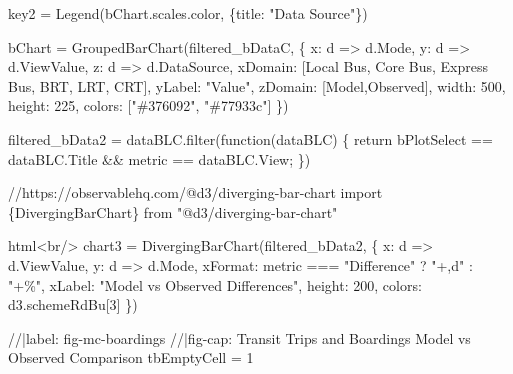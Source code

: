 \documentclass[
  letterpaper,
  DIV=11,
  numbers=noendperiod]{scrreprt}
\newenvironment{Shaded}{\begin{snugshade}}{\end{snugshade}}
\newcommand{\NormalTok}[1]{\textcolor[rgb]{0.00,0.23,0.31}{#1}}
\begin{document}
\begin{Shaded}
\begin{Highlighting}[]
\NormalTok{key2 = Legend(bChart.scales.color, \{title: "Data Source"\})}

\NormalTok{bChart = GroupedBarChart(filtered\_bDataC, \{}
\NormalTok{    x: d =\textgreater{} d.Mode,}
\NormalTok{    y: d =\textgreater{} d.ViewValue,}
\NormalTok{    z: d =\textgreater{} d.DataSource,}
\NormalTok{    xDomain: [\textquotesingle{}Local Bus\textquotesingle{}, \textquotesingle{}Core Bus\textquotesingle{}, \textquotesingle{}Express Bus\textquotesingle{}, \textquotesingle{}BRT\textquotesingle{}, \textquotesingle{}LRT\textquotesingle{}, \textquotesingle{}CRT\textquotesingle{}],}
\NormalTok{    yLabel: "Value",}
\NormalTok{    zDomain: [\textquotesingle{}Model\textquotesingle{},\textquotesingle{}Observed\textquotesingle{}],}
\NormalTok{    width: 500,}
\NormalTok{    height: 225,}
\NormalTok{    colors: ["\#376092", "\#77933c"]}
\NormalTok{\})}
\end{Highlighting}
\end{Shaded}

\begin{Shaded}
\begin{Highlighting}[]
\NormalTok{filtered\_bData2 = dataBLC.filter(function(dataBLC) \{}
\NormalTok{    return bPlotSelect == dataBLC.Title  \&\&}
\NormalTok{           metric == dataBLC.View;}
\NormalTok{\})}

\NormalTok{//https://observablehq.com/@d3/diverging{-}bar{-}chart}
\NormalTok{import \{DivergingBarChart\} from "@d3/diverging{-}bar{-}chart"}

\NormalTok{html\textasciigrave{}\textless{}br/\textgreater{}\textasciigrave{}}
\NormalTok{chart3 = DivergingBarChart(filtered\_bData2, \{}
\NormalTok{    x: d =\textgreater{} d.ViewValue,}
\NormalTok{    y: d =\textgreater{} d.Mode,}
\NormalTok{    xFormat: metric === "Difference" ? "+,d" : "+\%",}
\NormalTok{    xLabel: "Model vs Observed Differences",}
\NormalTok{    height: 200,}
\NormalTok{    colors: d3.schemeRdBu[3]}
\NormalTok{\})}
\end{Highlighting}
\end{Shaded}

\begin{Shaded}
\begin{Highlighting}[]
\NormalTok{//|label: fig{-}mc{-}boardings}
\NormalTok{//|fig{-}cap: Transit Trips and Boardings Model vs Observed Comparison}
\NormalTok{tbEmptyCell = 1}
\end{Highlighting}
\end{Shaded}
\end{document}
